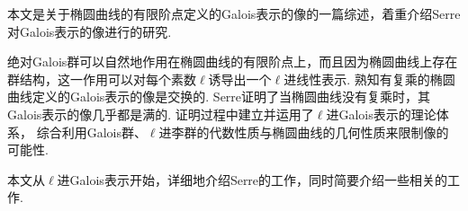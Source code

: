 本文是关于椭圆曲线的有限阶点定义的Galois表示的像的一篇综述，着重介绍Serre对Galois表示的像进行的研究.

绝对Galois群可以自然地作用在椭圆曲线的有限阶点上，而且因为椭圆曲线上存在群结构，这一作用可以对每个素数$\ell$诱导出一个$\ell$进线性表示.
熟知有复乘的椭圆曲线定义的Galois表示的像是交换的.
Serre证明了当椭圆曲线没有复乘时，其Galois表示的像几乎都是满的.
证明过程中建立并运用了$\ell$进Galois表示的理论体系，
综合利用Galois群、$\ell$进李群的代数性质与椭圆曲线的几何性质来限制像的可能性.

本文从$\ell$进Galois表示开始，详细地介绍Serre的工作，同时简要介绍一些相关的工作.
